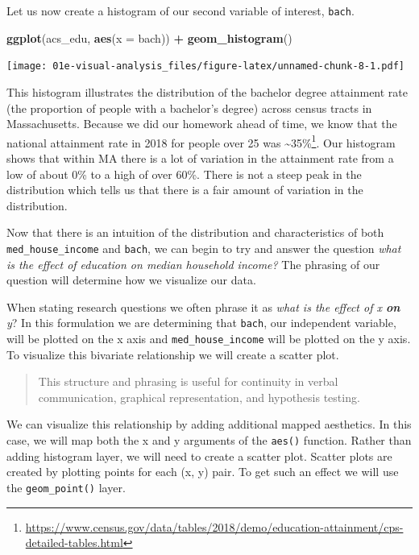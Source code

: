 \documentclass[
]{book}
\newenvironment{Shaded}{\begin{snugshade}}{\end{snugshade}}
\newcommand{\DataTypeTok}[1]{\textcolor[rgb]{0.13,0.29,0.53}{#1}}
\newcommand{\KeywordTok}[1]{\textcolor[rgb]{0.13,0.29,0.53}{\textbf{#1}}}
\newcommand{\NormalTok}[1]{#1}
\newcommand{\OperatorTok}[1]{\textcolor[rgb]{0.81,0.36,0.00}{\textbf{#1}}}
\newcommand{\StringTok}[1]{\textcolor[rgb]{0.31,0.60,0.02}{#1}}
\begin{document}
Let us now create a histogram of our second variable of interest, \texttt{bach}.

\begin{Shaded}
\begin{Highlighting}[]
\KeywordTok{ggplot}\NormalTok{(acs\_edu, }\KeywordTok{aes}\NormalTok{(}\DataTypeTok{x =}\NormalTok{ bach)) }\OperatorTok{+}\StringTok{ }
\StringTok{  }\KeywordTok{geom\_histogram}\NormalTok{()}
\end{Highlighting}
\end{Shaded}

\texttt{[image: 01e-visual-analysis\_files/figure-latex/unnamed-chunk-8-1.pdf]}

This histogram illustrates the distribution of the bachelor degree attainment rate (the proportion of people with a bachelor's degree) across census tracts in Massachusetts. Because we did our homework ahead of time, we know that the national attainment rate in 2018 for people over 25 was \textasciitilde35\%\footnote{\url{https://www.census.gov/data/tables/2018/demo/education-attainment/cps-detailed-tables.html}}. Our histogram shows that within MA there is a lot of variation in the attainment rate from a low of about 0\% to a high of over 60\%. There is not a steep peak in the distribution which tells us that there is a fair amount of variation in the distribution.

Now that there is an intuition of the distribution and characteristics of both \texttt{med\_house\_income} and \texttt{bach}, we can begin to try and answer the question \emph{what is the effect of education on median household income?} The phrasing of our question will determine how we visualize our data.

When stating research questions we often phrase it as \emph{what is the effect of x \textbf{on} y}? In this formulation we are determining that \texttt{bach}, our independent variable, will be plotted on the x axis and \texttt{med\_house\_income} will be plotted on the y axis. To visualize this bivariate relationship we will create a scatter plot.

\begin{quote}
This structure and phrasing is useful for continuity in verbal communication, graphical representation, and hypothesis testing.
\end{quote}

We can visualize this relationship by adding additional mapped aesthetics. In this case, we will map both the x and y arguments of the \texttt{aes()} function. Rather than adding histogram layer, we will need to create a scatter plot. Scatter plots are created by plotting points for each (x, y) pair. To get such an effect we will use the \texttt{geom\_point()} layer.
\end{document}
